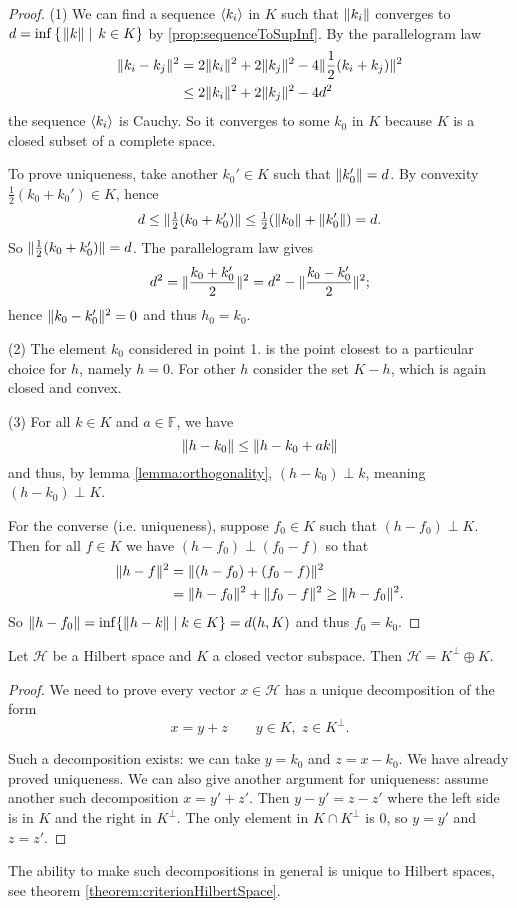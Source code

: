 \begin{proof}
(1) We can find a sequence $\langle k_i \rangle$ in $K$ such that $\lVert k_i\rVert$ converges to $d = \inf\left\{\left. \lVert k\rVert \;\right|\; k\in K \right\}$ by \ref{prop:sequenceToSupInf}. By the parallelogram law
\begin{align*}
\lVert k_i-k_j\rVert^2 &= 2\lVert k_i\rVert^2 + 2\lVert k_j\rVert^2 - 4\lVert\frac{1}{2}(k_i+k_j)\rVert^2 \\
&\leq 2\lVert k_i\rVert^2 + 2\lVert k_j\rVert^2 - 4d^2
\end{align*}
the sequence $\langle k_i \rangle$ is Cauchy. So it converges to some $k_0$ in $K$ because $K$ is a closed subset of a complete space.

To prove uniqueness, take another $k_0'\in K$ such that $\lVert k_0'\rVert=d$. By convexity $\tfrac{1}{2}(k_0 +k_0')\in K$, hence
\[ d\leq \lVert\tfrac{1}{2}(k_0+k_0')\rVert\leq \tfrac{1}{2}(\lVert k_0\rVert+\lVert k_0'\rVert) = d. \]
So $\lVert\tfrac{1}{2}(k_0+k_0')\rVert = d$. The parallelogram law gives
\[ d^2 = \lVert\frac{k_0+k_0'}{2}\rVert^2 = d^2- \lVert\frac{k_0-k_0'}{2}\rVert^2; \]
hence $\lVert k_0 - k_0'\rVert^2 = 0$ and thus $h_0=k_0$.

(2) The element $k_0$ considered in point 1. is the point closest to a particular choice for $h$, namely $h=0$. For other $h$ consider the set $K-h$, which is again closed and convex.

(3) For all $k\in K$ and $a\in \mathbb{F}$, we have
\[ \lVert h-k_0\rVert\leq \lVert h-k_0+ak\rVert \]
and thus, by lemma \ref{lemma:orthogonality}, $(h-k_0)\perp k$, meaning $(h-k_0)\perp K$.

For the converse (i.e. uniqueness), suppose $f_0\in K$ such that $(h-f_0)\perp K$. Then for all $f\in K$ we have $(h-f_0)\perp (f_0 -f)$ so that
\begin{align*}
\lVert h-f\rVert^2 &= \lVert(h-f_0) + (f_0-f)\rVert^2 \\
&= \lVert h-f_0\rVert^2 + \lVert f_0 - f\rVert^2 \geq \lVert h-f_0\rVert^2.
\end{align*}
So $\lVert h-f_0\rVert=\inf\{\lVert h-k\rVert\;|\; k\in K\} = d(h,K)$ and thus $f_0=k_0$.
\end{proof}
\begin{corollary}
Let $\mathcal{H}$ be a Hilbert space and $K$ a closed vector subspace. Then $\mathcal{H} = K^\perp \oplus K$.
\end{corollary}
\begin{proof}
We need to prove every vector $x\in \mathcal{H}$ has a unique decomposition of the form
\[ x = y+z \qquad y\in K,\; z\in K^\perp. \]

Such a decomposition exists: we can take $y=k_0$ and $z = x-k_0$. We have already proved uniqueness. We can also give another argument for uniqueness: assume another such decomposition $x=y'+z'$. Then $y-y'= z-z'$ where the left side is in $K$ and the right in $K^\perp$. The only element in $K\cap K^\perp$ is $0$, so $y=y'$ and $z=z'$.
\end{proof}
The ability to make such decompositions in general is unique to Hilbert spaces, see theorem \ref{theorem:criterionHilbertSpace}.

